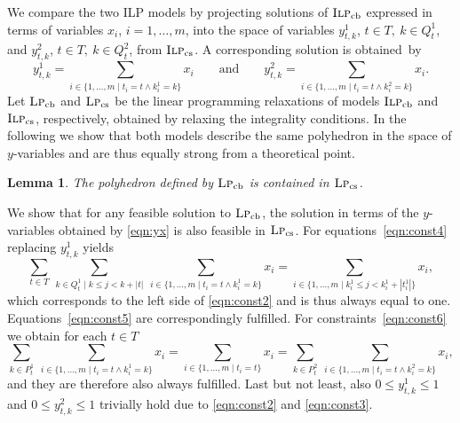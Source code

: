 \documentclass[11pt,a4paper]{article}
\newcommand{\MIPorig}{\textsc{Ilp}_{\mathrm{cb}}}
\newcommand{\MIPalt}{\textsc{Ilp}_{\mathrm{cs}}}
\newcommand{\LPorig}{\textsc{Lp}_{\mathrm{cb}}}
\newcommand{\LPalt}{\textsc{Lp}_{\mathrm{cs}}}
\newtheorem{lemma}[theorem]{Lemma}
\newenvironment{proof}[1][Proof]{\begin{trivlist}
\item[\hskip \labelsep {\bfseries #1}]}{\end{trivlist}}
\begin{document}
We compare the two ILP models by projecting solutions of $\MIPorig$
expressed in terms of variables $x_i$, $i=1,\ldots,m$, into the space of
variables $y^1_{t,k}$, $t\in T,\ k\in Q^1_t$, and $y^2_{t,k}$, $t\in T,\
k\in Q^2_t$, from $\MIPalt$. A corresponding solution is obtained~by
\begin{equation}
y^1_{t,k}=\sum_{i\in\{1,\ldots,m \mid t_i=t \land k^1_i=k\}} x_i
\qquad\mbox{and}\qquad
y^2_{t,k}=\sum_{i\in\{1,\ldots,m \mid t_i=t \land k^2_i=k\}} x_i.
\label{eqn:yx}
\end{equation}
Let $\LPorig$ and $\LPalt$ be the linear programming relaxations of
models $\MIPorig$ and $\MIPalt$, respectively, obtained by relaxing the
integrality conditions. In the following we show
that both models describe the same polyhedron in the space of
$y$-variables and are thus equally strong from a theoretical point.

\begin{lemma}
The polyhedron defined by $\LPorig$ is contained in $\LPalt$.
\end{lemma}
\begin{proof}
We show that for any feasible solution to $\LPorig$, the solution in
terms of the $y$-variables obtained by \eqref{eqn:yx} is also feasible in
$\LPalt$.
For equations~\eqref{eqn:const4} replacing $y^1_{t,k}$ yields
\begin{equation}
\sum_{t \in T}\ \sum_{k \in Q^1_t \mid k\le j < k+|t|}\  
	\sum_{i\in\{1,\ldots,m \mid t_i=t \land k^1_i=k\}} x_i =
	\sum_{i\in\{1,\ldots,m \mid k^1_i \le j < k^1_i+|t^1_i|\}} x_i,
	\label{eqn:colcorr}
\end{equation}
which corresponds to the left side of \eqref{eqn:const2} and is thus always equal to one.
Equations~\eqref{eqn:const5} are correspondingly fulfilled.
For constraints~\eqref{eqn:const6} we obtain for each $t\in T$
\begin{equation*}
\sum_{k\in P^1_t}\ \sum_{i\in\{1,\ldots,m \mid t_i=t \land k^1_i=k\}} x_i = 
\sum_{i\in\{1,\ldots,m \mid t_i=t\}} x_i =
\sum_{k\in P^2_t}\ \sum_{i\in\{1,\ldots,m \mid t_i=t \land k^2_i=k\}} x_i,
\end{equation*}
and they are therefore also always fulfilled.
Last but not least, also $0\le y^1_{t,k} \le 1$ and $0\le y^2_{t,k} \le 1$
trivially hold due to \eqref{eqn:const2} and \eqref{eqn:const3}.
\end{proof}
\end{document}
